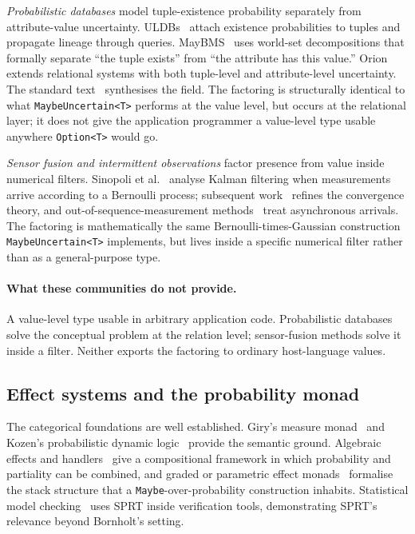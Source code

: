 \emph{Probabilistic databases} model tuple-existence probability separately
from attribute-value uncertainty. ULDBs~\cite{benjelloun2006uldb} attach
existence probabilities to tuples and propagate lineage through queries.
MayBMS~\cite{antova2007maybms} uses world-set decompositions that formally
separate ``the tuple exists'' from ``the attribute has this value.''
Orion~\cite{cheng2008orion} extends relational systems with both
tuple-level and attribute-level uncertainty. The standard
text~\cite{suciu2011pdb} synthesises the field. The factoring is structurally
identical to what \texttt{MaybeUncertain<T>} performs at the value level, but
occurs at the relational layer; it does not give the application programmer a
value-level type usable anywhere \texttt{Option<T>} would go.

\emph{Sensor fusion and intermittent observations} factor presence from
value inside numerical filters. Sinopoli et al.~\cite{sinopoli2004kalman}
analyse Kalman filtering when measurements arrive according to a Bernoulli
process; subsequent work~\cite{liu2004kalman,censi2011kalmansemi} refines the
convergence theory, and out-of-sequence-measurement
methods~\cite{orton2005oosm,barshalom2004oosm} treat asynchronous arrivals.
The factoring is mathematically the same Bernoulli-times-Gaussian construction
\texttt{MaybeUncertain<T>} implements, but lives inside a specific numerical
filter rather than as a general-purpose type.

\paragraph{What these communities do not provide.} A value-level type usable
in arbitrary application code. Probabilistic databases solve the conceptual
problem at the relation level; sensor-fusion methods solve it inside a filter.
Neither exports the factoring to ordinary host-language values.

\subsection{Effect systems and the probability monad}
\label{sec:bg:effects}

The categorical foundations are well established. Giry's measure
monad~\cite{giry1981categorical} and Kozen's probabilistic dynamic
logic~\cite{kozen1985probpdl} provide the semantic ground. Algebraic effects
and handlers~\cite{plotkin2009handlers,bauer2015eff,leijen2014koka} give a
compositional framework in which probability and partiality can be combined,
and graded or parametric effect monads~\cite{katsumata2014parametric}
formalise the stack structure that a \texttt{Maybe}-over-probability
construction inhabits. Statistical model checking~\cite{younes2006sprtmc} uses
SPRT inside verification tools, demonstrating SPRT's relevance beyond
Bornholt's setting.

